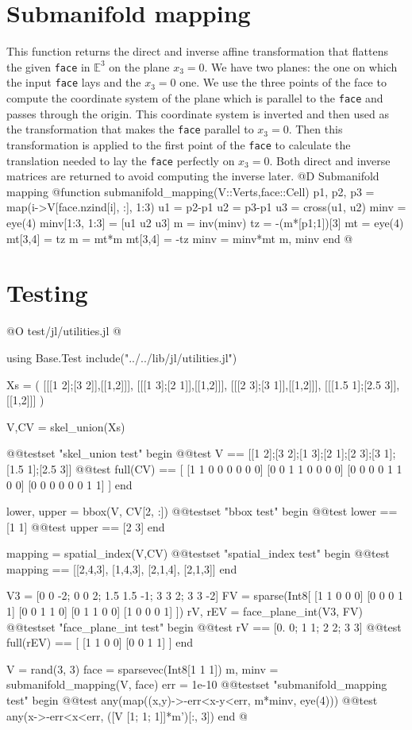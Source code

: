 \documentclass[10pt,oneside]{article}
\begin{document}
\section{Submanifold mapping}
This function returns the direct and inverse affine transformation that flattens the given \texttt{face} in $\mathbb{E}^3$
on the plane $x_3=0$. We have two planes: the one on which the input \texttt{face} lays and the $x_3=0$ one. 
We use the three points of the face to compute the coordinate system of the plane which is parallel 
to the \texttt{face} and passes through the origin. This coordinate system is inverted and then used as 
the transformation that makes the \texttt{face} parallel to $x_3=0$. Then this transformation is applied to the 
first point of the \texttt{face} to calculate the translation needed to lay the \texttt{face} perfectly on $x_3=0$.
Both direct and inverse matrices are returned to avoid computing the inverse later.
@D Submanifold mapping
@{function submanifold_mapping(V::Verts,face::Cell)
    p1, p2, p3 = map(i->V[face.nzind[i], :], 1:3)
    u1 = p2-p1
    u2 = p3-p1
    u3 = cross(u1, u2)
    minv = eye(4)
    minv[1:3, 1:3] = [u1 u2 u3]
    m = inv(minv)
    tz = -(m*[p1;1])[3]
    mt = eye(4)
    mt[3,4] = tz
    m = mt*m
    mt[3,4] = -tz
    minv = minv*mt
    m, minv
end
@}


\section{Testing}
@O test/jl/utilities.jl
@{using Base.Test
include("../../lib/jl/utilities.jl")

Xs = (
    [[[1 2];[3 2]],[[1,2]]],
    [[[1 3];[2 1]],[[1,2]]],
    [[[2 3];[3 1]],[[1,2]]],
    [[[1.5 1];[2.5 3]],[[1,2]]]
)

V,CV = skel_union(Xs)

@@testset "skel_union test" begin
    @@test V == [[1 2];[3 2];[1 3];[2 1];[2 3];[3 1];[1.5 1];[2.5 3]]
    @@test full(CV) == [
        [1 1 0 0 0 0 0 0]
        [0 0 1 1 0 0 0 0]
        [0 0 0 0 1 1 0 0]
        [0 0 0 0 0 0 1 1]
    ]
end

lower, upper = bbox(V, CV[2, :])
@@testset "bbox test" begin
    @@test lower == [1 1]
    @@test upper == [2 3]
end

mapping = spatial_index(V,CV)
@@testset "spatial_index test" begin
    @@test mapping == [[2,4,3], [1,4,3], [2,1,4], [2,1,3]]
end

V3 = [0 0 -2; 0 0 2; 1.5 1.5 -1; 3 3 2; 3 3 -2]
FV = sparse(Int8[
    [1 1 0 0 0]
    [0 0 0 1 1]
    [0 0 1 1 0]
    [0 1 1 0 0]
    [1 0 0 0 1]
])
rV, rEV = face_plane_int(V3, FV)
@@testset "face_plane_int test" begin
    @@test rV == [0. 0; 1 1; 2 2; 3 3]
    @@test full(rEV) == [
        [1 1 0 0]
        [0 0 1 1]
    ]
end

V = rand(3, 3)
face = sparsevec(Int8[1 1 1])
m, minv = submanifold_mapping(V, face)
err = 1e-10 
@@testset "submanifold_mapping test" begin
    @@test any(map((x,y)->-err<x-y<err, m*minv, eye(4)))
    @@test any(x->-err<x<err, ([V [1; 1; 1]]*m')[:, 3])
end
@}
\end{document}
